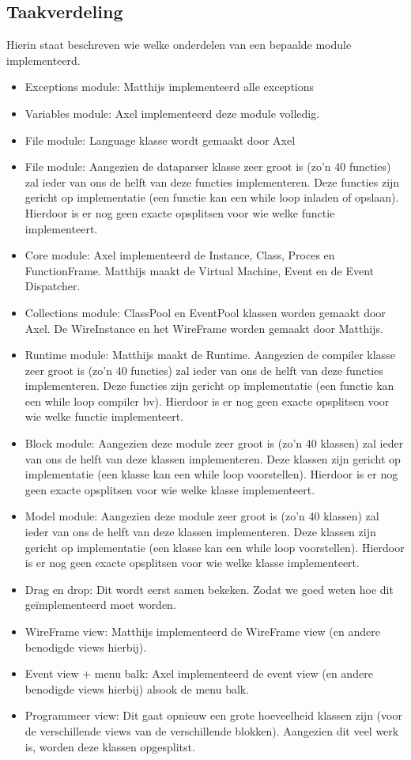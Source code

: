\documentclass[]{article}
\begin{document}
\subsection{Taakverdeling}
Hierin staat beschreven wie welke onderdelen van een bepaalde module implementeerd. 
\begin{itemize}
\item Exceptions module: Matthijs implementeerd alle exceptions
\item Variables module: Axel implementeerd deze module volledig. 
\item File module: Language klasse wordt gemaakt door Axel
\item File module: Aangezien de dataparser klasse zeer groot is (zo'n 40 functies) zal ieder van ons de helft van deze functies implementeren. Deze functies zijn gericht op implementatie (een functie kan een while loop inladen of opslaan). Hierdoor is er nog geen exacte opsplitsen voor wie welke functie implementeert.
\item Core module: Axel implementeerd de Instance, Class, Proces en FunctionFrame. Matthijs maakt de Virtual Machine, Event en de Event Dispatcher.
\item Collections module: ClassPool en EventPool klassen worden gemaakt door Axel. De WireInstance en het WireFrame worden gemaakt door Matthijs. 
\item Runtime module: Matthijs maakt de Runtime. Aangezien de compiler klasse zeer groot is (zo'n 40 functies) zal ieder van ons de helft van deze functies implementeren. Deze functies zijn gericht op implementatie (een functie kan een while loop compiler bv). Hierdoor is er nog geen exacte opsplitsen voor wie welke functie implementeert.
\item Block module: Aangezien deze module zeer groot is (zo'n 40 klassen) zal ieder van ons de helft van deze klassen implementeren. Deze klassen zijn gericht op implementatie (een klasse kan een while loop voorstellen). Hierdoor is er nog geen exacte opsplitsen voor wie welke klasse implementeert.
\item Model module: Aangezien deze module zeer groot is (zo'n 40 klassen) zal ieder van ons de helft van deze klassen implementeren. Deze klassen zijn gericht op implementatie (een klasse kan een while loop voorstellen). Hierdoor is er nog geen exacte opsplitsen voor wie welke klasse implementeert.
\item Drag en drop: Dit wordt eerst samen bekeken. Zodat we goed weten hoe dit ge\"{i}mplementeerd moet worden.
\item WireFrame view: Matthijs implementeerd de WireFrame view (en andere benodigde views hierbij).
 
\item Event view + menu balk: Axel implementeerd de event view (en andere benodigde views hierbij) alsook de menu balk.

\item Programmeer view: Dit gaat opnieuw een grote hoeveelheid klassen zijn (voor de verschillende views van de verschillende blokken). Aangezien dit veel werk is, worden deze klassen opgesplitst. 
\end{itemize}
\end{document}
